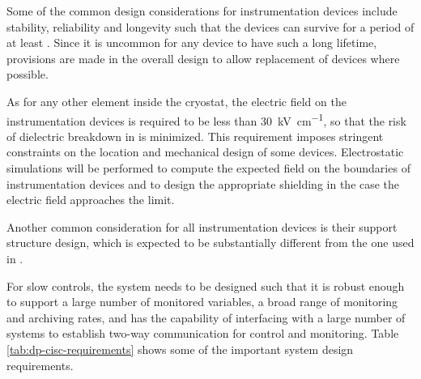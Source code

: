 Some of the common design considerations for
instrumentation devices include stability, reliability and longevity
such that the devices can survive for a period of at least \dunelifetime{}.  Since it is uncommon for any device
to have such a long lifetime, provisions are made in the overall
design to allow replacement of devices where possible.

As for any other element inside the cryostat, 
the electric field on the instrumentation devices is 
required to be less than \SI{30}{kV\per\cm},
so that the risk of dielectric breakdown in  is minimized.
This requirement imposes stringent constraints on the location and mechanical 
design of some devices. Electrostatic simulations  
will be performed to compute the expected field on the boundaries of 
instrumentation devices and to design the appropriate \efield shielding
in the case the electric field approaches the limit. 

Another common consideration for all instrumentation devices is their support structure
design, which is expected to be substantially different from the one used in .

For slow controls, the system needs to be designed such that it is 
robust enough to support a large number of monitored variables, a broad range of
monitoring and archiving rates, and has the capability of interfacing 
with a large number of systems to establish two-way communication for
control and monitoring. Table \ref{tab:dp-cisc-requirements} shows
some of the important  system design requirements.

